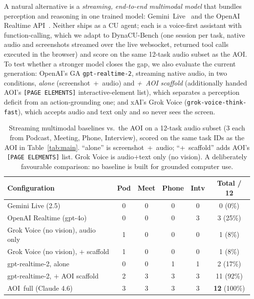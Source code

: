 \documentclass[11pt]{article}
\begin{document}
A natural alternative is a \emph{streaming, end-to-end multimodal model} that bundles
perception and reasoning in one trained model: Gemini~Live~\citep{geminilive} and the
OpenAI Realtime API~\citep{openairealtime}. Neither ships as a CU agent; each is a
voice-first assistant with function-calling, which we adapt to DynaCU-Bench (one session
per task, native audio and screenshots streamed over the live websocket, returned tool
calls executed in the browser) and score on the same 12-task audio subset as the AOI.
To test whether a stronger model closes the gap, we also evaluate the current generation:
OpenAI's GA \texttt{gpt-realtime-2}, streaming native audio, in two conditions,
\emph{alone} (screenshot~+~audio) and \emph{+~AOI scaffold} (additionally handed AOI's
\texttt{[PAGE ELEMENTS]} interactive-element list), which separates a perception deficit
from an action-grounding one; and xAI's Grok Voice (\texttt{grok-voice-think-fast}), which
accepts audio and text only and so never sees the screen.

\begin{table}[t]
\centering
\caption{Streaming multimodal baselines vs.\ the AOI on a 12-task audio subset
(3 each from Podcast, Meeting, Phone, Interview), scored on the same task IDs as the
AOI in Table~\ref{tab:main}. ``alone'' is screenshot~+~audio; ``+~scaffold'' adds AOI's
\texttt{[PAGE ELEMENTS]} list. Grok Voice is audio$+$text only (no vision). A
deliberately favourable comparison: no baseline is built for grounded computer use.}
\label{tab:streaming}
\small
\setlength{\tabcolsep}{4.5pt}
\begin{tabular}{@{}l cccc c@{}}
\toprule
\textbf{Configuration} & \textbf{Pod} & \textbf{Meet} & \textbf{Phone} & \textbf{Intv} & \textbf{Total / 12} \\
\midrule
Gemini Live (2.5)                   & 0 & 0 & 0 & 0 & 0 \scriptsize(0\%) \\
OpenAI Realtime (gpt-4o)            & 0 & 0 & 0 & 3 & 3 \scriptsize(25\%) \\
Grok Voice (no vision), audio only  & 1 & 0 & 0 & 0 & 1 \scriptsize(8\%) \\
Grok Voice (no vision), $+$ scaffold & 1 & 0 & 0 & 0 & 1 \scriptsize(8\%) \\
gpt-realtime-2, alone               & 0 & 0 & 1 & 1 & 2 \scriptsize(17\%) \\
gpt-realtime-2, $+$ AOI scaffold    & 2 & 3 & 3 & 3 & 11 \scriptsize(92\%) \\
\rowcolor{bestcolor}
AOI~full (Claude 4.6)               & 3 & 3 & 3 & 3 & \textbf{12} \scriptsize(100\%) \\
\bottomrule
\end{tabular}
\end{table}
\end{document}
